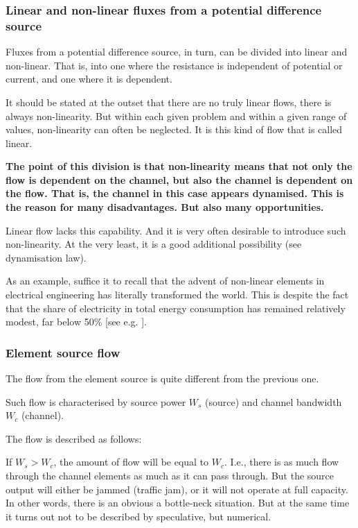 \documentclass[a4paper,11pt]{article}
\begin{document}
\subsubsection*{Linear and non-linear fluxes from a potential difference
  source} 

Fluxes from a potential difference source, in turn, can be divided into linear
and non-linear. That is, into one where the resistance is independent of
potential or current, and one where it is dependent.

It should be stated at the outset that there are no truly linear flows, there
is always non-linearity. But within each given problem and within a given
range of values, non-linearity can often be neglected. It is this kind of flow
that is called linear.

\textbf{The point of this division is that non-linearity means that not only
  the flow is dependent on the channel, but also the channel is dependent on
  the flow. That is, the channel in this case appears dynamised. This is the
  reason for many disadvantages. But also many opportunities.}

Linear flow lacks this capability. And it is very often desirable to introduce
such non-linearity. At the very least, it is a good additional possibility
(see dynamisation law).

As an example, suffice it to recall that the advent of non-linear elements in
electrical engineering has literally transformed the world. This is despite
the fact that the share of electricity in total energy consumption has
remained relatively modest, far below 50\% [see e.g. \cite{B13}].

\subsubsection{Element source flow}

The flow from the element source is quite different from the previous one.

Such flow is characterised by source power $W_s$ (source) and channel
bandwidth $W_c$ (channel).

The flow is described as follows:

If $W_s>W_c$, the amount of flow will be equal to $W_c$. I.e., there is as
much flow through the channel elements as much as it can pass through. But the
source output will either be jammed (traffic jam), or it will not operate at
full capacity. In other words, there is an obvious a bottle-neck situation.
But at the same time it turns out not to be described by speculative, but
numerical.
\end{document}
